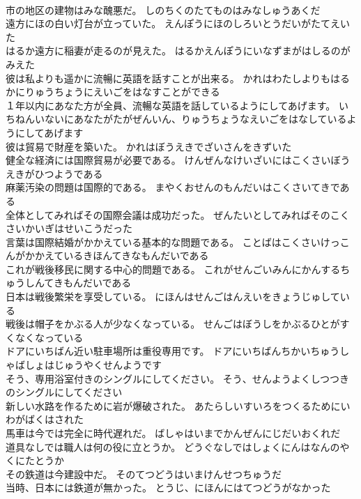 \documentclass[8pt]{extreport}
\begin{document}
\begin{CJK}{UTF8}{min}
\\	市の地区の建物はみな醜悪だ。	しのちくのたてものはみなしゅうあくだ 
\\	遠方にほの白い灯台が立っていた。	えんぽうにほのしろいとうだいがたてえいた 
\\	はるか遠方に稲妻が走るのが見えた。	はるかえんぽうにいなずまがはしるのがみえた 
\\	彼は私よりも遥かに流暢に英語を話すことが出来る。	かれはわたしよりもはるかにりゅうちょうにえいごをはなすことができる 
\\	１年以内にあなた方が全員、流暢な英語を話しているようにしてあげます。	いちねんいないにあなたがたがぜんいん、りゅうちょうなえいごをはなしているようにしてあげます 
\\	彼は貿易で財産を築いた。	かれはぼうえきでざいさんをきずいた 
\\	健全な経済には国際貿易が必要である。	けんぜんなけいざいにはこくさいぼうえきがひつようである 
\\	麻薬汚染の問題は国際的である。	まやくおせんのもんだいはこくさいてきである 
\\	全体としてみればその国際会議は成功だった。	ぜんたいとしてみればそのこくさいかいぎはせいこうだった 
\\	言葉は国際結婚がかかえている基本的な問題である。	ことばはこくさいけっこんがかかえているきほんてきなもんだいである 
\\	これが戦後移民に関する中心的問題である。	これがせんごいみんにかんするちゅうしんてきもんだいである 
\\	日本は戦後繁栄を享受している。	にほんはせんごはんえいをきょうじゅしている 
\\	戦後は帽子をかぶる人が少なくなっている。	せんごはぼうしをかぶるひとがすくなくなっている 
\\	ドアにいちばん近い駐車場所は重役専用です。	ドアにいちばんちかいちゅうしゃばしょはじゅうやくせんようです 
\\	そう、専用浴室付きのシングルにしてください。	そう、せんようよくしつつきのシングルにしてください 
\\	新しい水路を作るために岩が爆破された。	あたらしいすいろをつくるためにいわがばくはされた 
\\	馬車は今では完全に時代遅れだ。	ばしゃはいまでかんぜんにじだいおくれだ 
\\	道具なしでは職人は何の役に立とうか。	どうぐなしではしょくにんはなんのやくにたとうか 
\\	その鉄道は今建設中だ。	そのてつどうはいまけんせつちゅうだ 
\\	当時、日本には鉄道が無かった。	とうじ、にほんにはてつどうがなかった 

\end{CJK}
\end{document}
